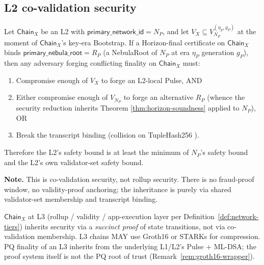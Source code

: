 
\subsection*{L2 co-validation security}

\begin{theorem}
\label{thm:l2-covalidation}
Let $\mathsf{Chain}_X$ be an L2 with
$\mathsf{primary\_network\_id} = N_P$, and let
$V_X \subseteq V_{N_P}^{(\eta_P, g_P)}$ at the moment of
$\mathsf{Chain}_X$'s key-era Bootstrap. If a Horizon-final certificate
on $\mathsf{Chain}_X$ binds
$\mathsf{primary\_nebula\_root} = R_P$ (a NebulaRoot of $N_P$ at era
$\eta_P$ generation $g_P$), then any adversary forging conflicting
finality on $\mathsf{Chain}_X$ must:
\begin{enumerate}[nosep]
  \item Compromise enough of $V_X$ to forge an L2-local Pulse, AND
  \item Either compromise enough of $V_{N_P}$ to forge an alternative
        $R_P$ (whence the security reduction inherits Theorem
        \ref{thm:horizon-soundness} applied to $N_P$), OR
  \item Break the transcript binding (collision on TupleHash256
        \cite{nistsp800185}).
\end{enumerate}
Therefore the L2's safety bound is at least the minimum of $N_P$'s
safety bound and the L2's own validator-set safety bound.

\textbf{Note.} This is co-validation security, not rollup security.
There is no fraud-proof window, no validity-proof anchoring; the
inheritance is purely via shared validator-set membership and
transcript binding.
\end{theorem}

\begin{remark}
$\mathsf{Chain}_X$ at L3 (rollup / validity / app-execution layer per
Definition~\ref{def:network-tiers}) inherits security via a
\emph{succinct proof} of state transitions, not via co-validation
membership. L3 chains MAY use Groth16 or STARKs for compression. PQ
finality of an L3 inherits from the underlying L1/L2's Pulse + ML-DSA;
the proof system itself is not the PQ root of trust
(Remark~\ref{rem:groth16-wrapper}).
\end{remark}
